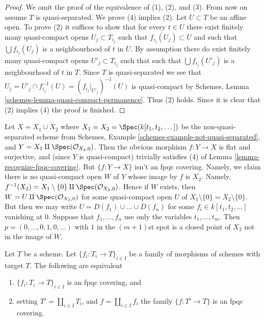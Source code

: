 \begin{proof}
We omit the proof of the equivalence of (1), (2), and (3).
From now on assume $T$ is quasi-separated.
We prove (4) implies (2). Let $U \subset T$ be an affine open.
To prove (2) it suffices to show that for every $t \in U$ there exist
finitely many quasi-compact opens $U_j \subset T_{i_j}$ such that
$f_{i_j}(U_j) \subset U$ and such that $\bigcup f_{i_j}(U_j)$
is a neighbourhood of $t$ in $U$. By assumption there do exist
finitely many quasi-compact opens $U'_j \subset T_{i_j}$ such that
such that $\bigcup f_{i_j}(U'_j)$ is a neighbourhood of $t$ in $T$.
Since $T$ is quasi-separated we see that
$U_j = U'_j \cap f_{i_j}^{-1}(U) = (f_{i_j}|_{U'_j})^{-1}(U)$
is quasi-compact by
Schemes, Lemma \ref{schemes-lemma-quasi-compact-permanence}.
Thus (2) holds. Since it is clear that (2) implies
(4) the proof is finished.
\end{proof}

\begin{example}
\label{example-not-fpqc}
Let $X = X_1 \cup X_2$ where $X_1 = X_2 = \Spec(k[t_1,t_2,\dots])$
be the non-quasi-separated scheme from
Schemes, Example \ref{schemes-example-not-quasi-separated}, and
$Y = X_1 \amalg \Spec(\mathcal{O}_{X_2, 0})$.
Then the obvious morphism $f : Y \to X$
is flat and surjective, and (since $Y$ is quasi-compact)
trivially satisfies (4) of Lemma \ref{lemma-recognize-fpqc-covering}.
But $\{f : Y \to X\}$ isn't an fpqc covering. Namely, we claim there
is no quasi-compact open $W$ of $Y$ whose image by $f$ is $X_2$.
Namely, $f^{-1}(X_2) = X_1 \setminus \{0\} \amalg \Spec(\mathcal{O}_{X_2, 0})$.
Hence if $W$ exists, then $W = U \amalg \Spec(\mathcal{O}_{X_2, 0})$
for some quasi-compact open $U$ of $X_1 \setminus \{0\} = X_2 \setminus \{0\}$.
But then we may write $U = D(f_1) \cup \ldots \cup D(f_n)$ for
some $f_i \in k[t_1, t_2, \ldots]$ vanishing at $0$.
Suppose that $f_1, \ldots, f_n$ use only the variables
$t_1, \ldots, t_m$. Then $p = (0, \ldots, 0, 1, 0, \ldots)$ with $1$
in the $(m + 1)$st spot is a closed point of $X_2$ not in the image
of $W$.
\end{example}

\begin{lemma}
\label{lemma-disjoint-union-is-fpqc-covering}
Let $T$ be a scheme. Let $\{f_i : T_i \to T\}_{i \in I}$ be a family of
morphisms of schemes with target $T$. The following are equivalent
\begin{enumerate}
\item $\{f_i : T_i \to T\}_{i \in I}$ is an fpqc covering, and
\item setting $T' = \coprod_{i \in I} T_i$, and $f = \coprod_{i \in I} f_i$
the family $\{f : T' \to T\}$ is an fpqc covering.
\end{enumerate}
\end{lemma}

